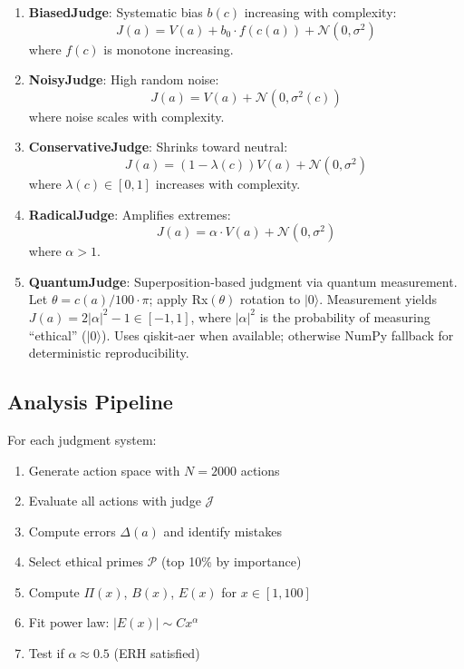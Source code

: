 \documentclass[12pt,a4paper]{article}
\theoremstyle{definition}
\theoremstyle{remark}
\begin{document}
\begin{enumerate}
    \item \textbf{BiasedJudge}: Systematic bias $b(c)$ increasing with complexity:
    \[
    J(a) = V(a) + b_0 \cdot f(c(a)) + \mathcal{N}(0, \sigma^2)
    \]
    where $f(c)$ is monotone increasing.
    
    \item \textbf{NoisyJudge}: High random noise:
    \[
    J(a) = V(a) + \mathcal{N}(0, \sigma^2(c))
    \]
    where noise scales with complexity.
    
    \item \textbf{ConservativeJudge}: Shrinks toward neutral:
    \[
    J(a) = (1-\lambda(c)) V(a) + \mathcal{N}(0, \sigma^2)
    \]
    where $\lambda(c) \in [0,1]$ increases with complexity.
    
    \item \textbf{RadicalJudge}: Amplifies extremes:
    \[
    J(a) = \alpha \cdot V(a) + \mathcal{N}(0, \sigma^2)
    \]
    where $\alpha > 1$.
    
    \item \textbf{QuantumJudge}: Superposition-based judgment via quantum measurement. Let $\theta = c(a)/100 \cdot \pi$; apply Rx$(\theta)$ rotation to $|0\rangle$. Measurement yields $J(a) = 2|\alpha|^2 - 1 \in [-1, 1]$, where $|\alpha|^2$ is the probability of measuring ``ethical'' ($|0\rangle$). Uses qiskit-aer when available; otherwise NumPy fallback for deterministic reproducibility.
\end{enumerate}

\subsection{Analysis Pipeline}

For each judgment system:
\begin{enumerate}
    \item Generate action space with $N = 2000$ actions
    \item Evaluate all actions with judge $\mathcal{J}$
    \item Compute errors $\Delta(a)$ and identify mistakes
    \item Select ethical primes $\mathcal{P}$ (top 10\% by importance)
    \item Compute $\Pi(x)$, $B(x)$, $E(x)$ for $x \in [1, 100]$
    \item Fit power law: $|E(x)| \sim C x^\alpha$
    \item Test if $\alpha \approx 0.5$ (ERH satisfied)
\end{enumerate}
\end{document}
